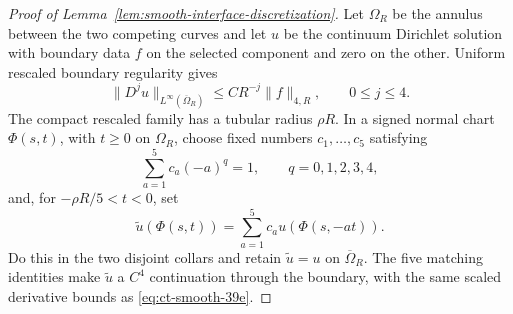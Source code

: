 \begin{proof}[Proof of Lemma~\ref{lem:smooth-interface-discretization}]
Let $\Omega_R$ be the annulus between the two competing curves and let
$u$ be the continuum Dirichlet solution with boundary data $f$ on the
selected component and zero on the other.  Uniform rescaled boundary
regularity gives
\begin{equation}
\|D^ju\|_{L^\infty(\overline\Omega_R)}
       \le CR^{-j}\|f\|_{4,R},\qquad0\le j\le4.\label{eq:ct-smooth-39e}
\end{equation}
The compact rescaled family has a tubular radius $\rho R$.  In a signed
normal chart $\Phi(s,t)$, with $t\ge0$ on $\Omega_R$, choose fixed
numbers $c_1,\ldots,c_5$ satisfying
\[
\sum_{a=1}^5c_a(-a)^q=1,
             \qquad q=0,1,2,3,4,
\]
and, for $-\rho R/5<t<0$, set
\[
\widetilde u(\Phi(s,t))=\sum_{a=1}^5c_a u(\Phi(s,-at)).
\]
Do this in the two disjoint collars and retain $\widetilde u=u$ on
$\overline\Omega_R$.  The five matching identities make
$\widetilde u$ a $C^4$ continuation through the boundary, with the
same scaled derivative bounds as \eqref{eq:ct-smooth-39e}.


\end{proof}

